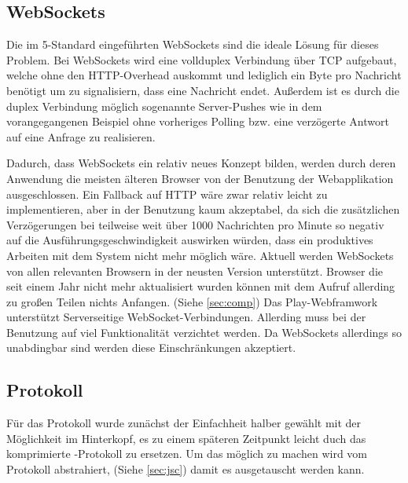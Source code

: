 \subsection{WebSockets}
\label{sec:ws}

Die im 5-Standard eingeführten WebSockets sind die ideale Lösung für dieses Problem. Bei
WebSockets wird eine vollduplex Verbindung über TCP aufgebaut, welche ohne den HTTP-Overhead
auskommt und lediglich ein Byte pro Nachricht benötigt um zu signalisiern, dass eine Nachricht
endet. Außerdem ist es durch die duplex Verbindung möglich sogenannte Server-Pushes wie in dem
vorangegangenen Beispiel ohne vorheriges Polling bzw. eine verzögerte Antwort auf eine Anfrage zu
realisieren.

Dadurch, dass WebSockets ein relativ neues Konzept bilden, werden durch deren Anwendung die meisten
älteren Browser von der Benutzung der Webapplikation ausgeschlossen. Ein Fallback auf HTTP wäre zwar
relativ leicht zu implementieren, aber in der Benutzung kaum akzeptabel, da sich die zusätzlichen
Verzögerungen bei teilweise weit über 1000 Nachrichten pro Minute so negativ auf die
Ausführungsgeschwindigkeit auswirken würden, dass ein produktives Arbeiten mit dem System nicht mehr
möglich wäre. Aktuell werden WebSockets von allen relevanten Browsern in der neusten Version
unterstützt. Browser die seit einem Jahr nicht mehr aktualisiert wurden können mit dem Aufruf
allerding zu großen Teilen nichts Anfangen. (Siehe \ref{sec:comp}) Das Play-Webframwork unterstützt
Serverseitige WebSocket-Verbindungen. Allerding muss bei der Benutzung auf viel Funktionalität
verzichtet werden. Da WebSockets allerdings so unabdingbar sind werden diese Einschränkungen
akzeptiert.

\subsection{Protokoll}

Für das Protokoll wurde zunächst der Einfachheit halber  gewählt mit der Möglichkeit im
Hinterkopf, es zu einem späteren Zeitpunkt leicht duch das komprimierte -Protokoll zu
ersetzen. Um das möglich zu machen wird vom Protokoll abstrahiert, (Siehe \ref{sec:jsc}) damit es
ausgetauscht werden kann.